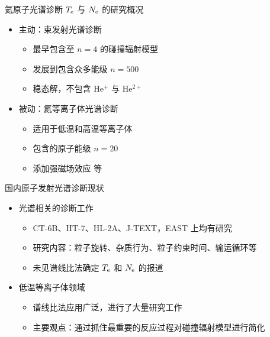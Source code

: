 \begin{frame}{氦原子光谱诊断 $T_{\rm e}$ 与 $N_{\rm e}$ 的研究概况}
	\begin{itemize}
		\item 主动：束发射光谱诊断
			\begin{itemize}
				\item 最早包含至 $n=4$ 的碰撞辐射模型 
				\item 发展到包含众多能级 $n=500$ 
				\item 稳态解，不包含 He$^+$ 与 He$^{2+}$
			\end{itemize}
		\bigskip
		\item 被动：氦等离子体光谱诊断\\ 
			\begin{itemize}
				\item 适用于低温和高温等离子体
				\item 包含的原子能级 $n=20$
				\item 添加强磁场效应 等
			\end{itemize}
	\end{itemize}
\end{frame}

\begin{frame}{国内原子发射光谱诊断现状}
	\begin{itemize}
		\item 光谱相关的诊断工作
			\begin{itemize}
				\item CT-6B、HT-7、HL-2A、J-TEXT，EAST 上均有研究
				\item 研究内容：粒子旋转、杂质行为、粒子约束时间、输运循环等
				\item 未见谱线比法确定 $T_{\rm e}$ 和 $N_{\rm e}$ 的报道
			\end{itemize}
		\bigskip
		\item 低温等离子体领域
			\begin{itemize}
				\item 谱线比法应用广泛，进行了大量研究工作 
				\item 主要观点：通过抓住最重要的反应过程对碰撞辐射模型进行简化\\ 
			\end{itemize}
	\end{itemize}
\end{frame}

